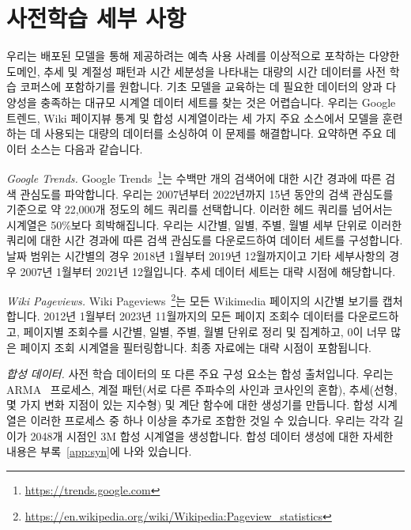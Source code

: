 \documentclass{article}
\begin{document}

\section{사전학습 세부 사항}
\label{sec:pretrain}

우리는 배포된 모델을 통해 제공하려는 예측 사용 사례를 이상적으로 포착하는 다양한 도메인, 추세 및 계절성 패턴과 시간 세분성을 나타내는 대량의 시간 데이터를 사전 학습 코퍼스에 포함하기를 원합니다. 기초 모델을 교육하는 데 필요한 데이터의 양과 다양성을 충족하는 대규모 시계열 데이터 세트를 찾는 것은 어렵습니다. 우리는 Google 트렌드, Wiki 페이지뷰 통계 및 합성 시계열이라는 세 가지 주요 소스에서 모델을 훈련하는 데 사용되는 대량의 데이터를 소싱하여 이 문제를 해결합니다. 요약하면 주요 데이터 소스는 다음과 같습니다.

{\it Google Trends.} Google Trends~\footnote{\url{https://trends.google.com}}는 수백만 개의 검색어에 대한 시간 경과에 따른 검색 관심도를 파악합니다. 우리는 2007년부터 2022년까지 15년 동안의 검색 관심도를 기준으로 약 22,000개 정도의 헤드 쿼리를 선택합니다. 이러한 헤드 쿼리를 넘어서는 시계열은 50\%보다 희박해집니다. 우리는 시간별, 일별, 주별, 월별 세부 단위로 이러한 쿼리에 대한 시간 경과에 따른 검색 관심도를 다운로드하여 데이터 세트를 구성합니다. 날짜 범위는 시간별의 경우 2018년 1월부터 2019년 12월까지이고 기타 세부사항의 경우 2007년 1월부터 2021년 12월입니다.  추세 데이터 세트는 대략  시점에 해당합니다.

{\it Wiki Pageviews.} Wiki Pageviews~\footnote{\url{https://en.wikipedia.org/wiki/Wikipedia:Pageview_statistics}}는 모든 Wikimedia 페이지의 시간별 보기를 캡처합니다. 2012년 1월부터 2023년 11월까지의 모든 페이지 조회수 데이터를 다운로드하고, 페이지별 조회수를 시간별, 일별, 주별, 월별 단위로 정리 및 집계하고, 0이 너무 많은 페이지 조회 시계열을 필터링합니다. 최종 자료에는 대략  시점이 포함됩니다.

{\it 합성 데이터.} 사전 학습 데이터의 또 다른 주요 구성 요소는 합성 출처입니다. 우리는 ARMA~\citep{mckenzie1984general} 프로세스, 계절 패턴(서로 다른 주파수의 사인과 코사인의 혼합), 추세(선형, 몇 가지 변화 지점이 있는 지수형) 및 계단 함수에 대한 생성기를 만듭니다. 합성 시계열은 이러한 프로세스 중 하나 이상을 추가로 조합한 것일 수 있습니다. 우리는 각각 길이가 2048개 시점인 3M 합성 시계열을 생성합니다. 합성 데이터 생성에 대한 자세한 내용은 부록~\ref{app:syn}에 나와 있습니다.
\end{document}
